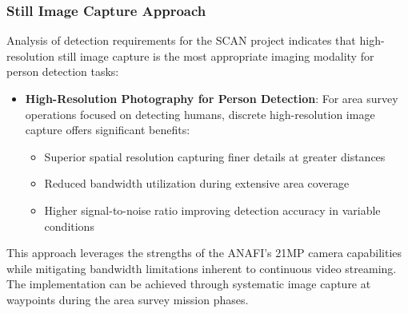 \subsubsection{Still Image Capture Approach}

Analysis of detection requirements for the SCAN project indicates that high-resolution still image capture is the most appropriate imaging modality for person detection tasks:

\begin{itemize}
    \item \textbf{High-Resolution Photography for Person Detection}: For area survey operations focused on detecting humans, discrete high-resolution image capture offers significant benefits:
    \begin{itemize}
        \item Superior spatial resolution capturing finer details at greater distances \cite{Mueller2019}
        \item Reduced bandwidth utilization during extensive area coverage \cite{Gao2020}
        \item Higher signal-to-noise ratio improving detection accuracy in variable conditions \cite{Wu2019}
    \end{itemize}
\end{itemize}

This approach leverages the strengths of the ANAFI's 21MP camera capabilities while mitigating bandwidth limitations inherent to continuous video streaming. The implementation can be achieved through systematic image capture at waypoints during the area survey mission phases.